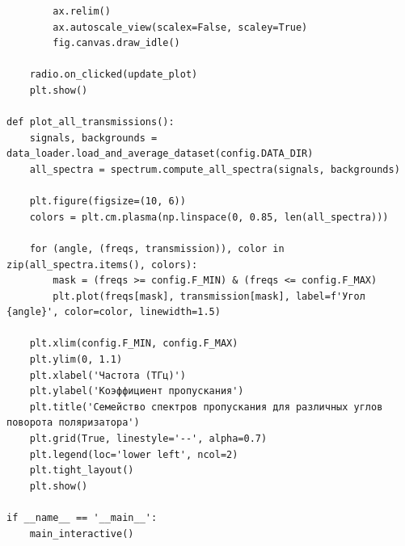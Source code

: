 \begin{verbatim}
        ax.relim()
        ax.autoscale_view(scalex=False, scaley=True)
        fig.canvas.draw_idle()

    radio.on_clicked(update_plot)
    plt.show()

def plot_all_transmissions():
    signals, backgrounds = data_loader.load_and_average_dataset(config.DATA_DIR)
    all_spectra = spectrum.compute_all_spectra(signals, backgrounds)
    
    plt.figure(figsize=(10, 6))
    colors = plt.cm.plasma(np.linspace(0, 0.85, len(all_spectra)))
    
    for (angle, (freqs, transmission)), color in zip(all_spectra.items(), colors):
        mask = (freqs >= config.F_MIN) & (freqs <= config.F_MAX)
        plt.plot(freqs[mask], transmission[mask], label=f'Угол {angle}', color=color, linewidth=1.5)
        
    plt.xlim(config.F_MIN, config.F_MAX)
    plt.ylim(0, 1.1)
    plt.xlabel('Частота (ТГц)')
    plt.ylabel('Коэффициент пропускания')
    plt.title('Семейство спектров пропускания для различных углов поворота поляризатора')
    plt.grid(True, linestyle='--', alpha=0.7)
    plt.legend(loc='lower left', ncol=2)
    plt.tight_layout()
    plt.show()

if __name__ == '__main__':
    main_interactive()
\end{verbatim}

